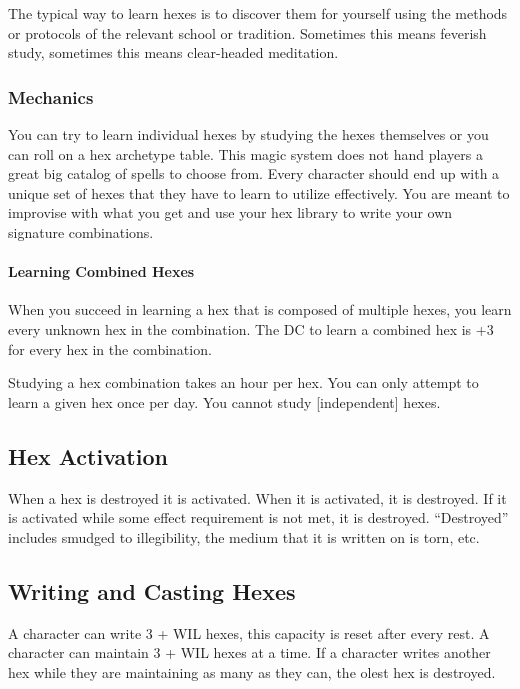 \documentclass[
  letterpaper,
  DIV=11,
  numbers=noendperiod]{scrartcl}
\let\oldparagraph\paragraph
\renewcommand{\paragraph}[1]{\oldparagraph{#1}\mbox{}}
\begin{document}
The typical way to learn hexes is to discover them for yourself using
the methods or protocols of the relevant school or tradition. Sometimes
this means feverish study, sometimes this means clear-headed meditation.

\subsubsection{Mechanics}\label{mechanics}

You can try to learn individual hexes by studying the hexes themselves
or you can roll on a hex archetype table. This magic system does not
hand players a great big catalog of spells to choose from. Every
character should end up with a unique set of hexes that they have to
learn to utilize effectively. You are meant to improvise with what you
get and use your hex library to write your own signature combinations.

\paragraph{Learning Combined Hexes}\label{learning-combined-hexes}

When you succeed in learning a hex that is composed of multiple hexes,
you learn every unknown hex in the combination. The DC to learn a
combined hex is +3 for every hex in the combination.

Studying a hex combination takes an hour per hex. You can only attempt
to learn a given hex once per day. You cannot study {[}independent{]}
hexes.

\subsection{Hex Activation}\label{hex-activation}

When a hex is destroyed it is activated. When it is activated, it is
destroyed. If it is activated while some effect requirement is not met,
it is destroyed. ``Destroyed'' includes smudged to illegibility, the
medium that it is written on is torn, etc.

\subsection{Writing and Casting Hexes}\label{writing-and-casting-hexes}

A character can write 3 + WIL hexes, this capacity is reset after every
rest. A character can maintain 3 + WIL hexes at a time. If a character
writes another hex while they are maintaining as many as they can, the
olest hex is destroyed.
\end{document}

